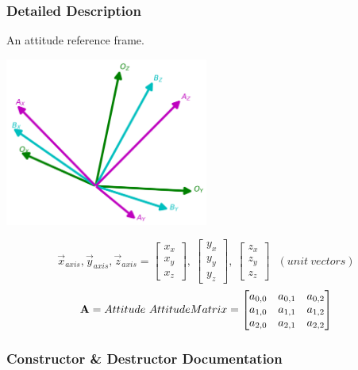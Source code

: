 \subsubsection{Detailed Description}
An attitude reference frame. 

 
\begin{DoxyImageNoCaption}
  \mbox{\includegraphics[width=0.5\textwidth]{frames}}
\end{DoxyImageNoCaption}


\[ \vec{x}_{axis}, \vec{y}_{axis}, \vec{z}_{axis} = \begin{bmatrix} x_x\\x_y\\x_z \end{bmatrix},~ \begin{bmatrix} y_x\\y_y\\y_z \end{bmatrix},~ \begin{bmatrix} z_x\\z_y\\z_z \end{bmatrix} ~~~(unit~vectors) \] \[ {\bf{A}} = Attitude~AttitudeMatrix = \begin{bmatrix} a_{0,0} & a_{0,1} & a_{0,2} \\ a_{1,0} & a_{1,1} & a_{1,2} \\ a_{2,0} & a_{2,1} & a_{2,2} \end{bmatrix} \] 

\subsubsection{Constructor \& Destructor Documentation}
\mbox{\label{classosse_1_1collaborate_1_1_reference_frame_aa7a87b7392e85b87cf0994457f0b5b6a}} 
